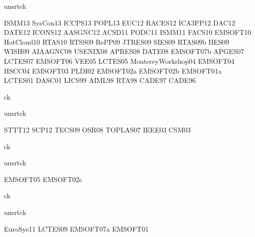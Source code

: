 {unsrtck}

\nocite{conferences}{ISMM13}
\nocite{conferences}{SysCon13}
\nocite{conferences}{ICCPS13}
\nocite{conferences}{POPL13}
\nocite{conferences}{EUC12}
\nocite{conferences}{RACES12}
\nocite{conferences}{ICA3PP12}
\nocite{conferences}{DAC12}
\nocite{conferences}{DATE12}
\nocite{conferences}{ICONS12}
\nocite{conferences}{AASGNC12}
\nocite{conferences}{ACSD11}
\nocite{conferences}{PODC11}
\nocite{conferences}{ISMM11}
\nocite{conferences}{FACS10}
\nocite{conferences}{EMSOFT10}
\nocite{conferences}{HotCloud10}
\nocite{conferences}{RTAS10}
\nocite{conferences}{RTSS09}
\nocite{conferences}{RePP09}
\nocite{conferences}{JTRES09}
\nocite{conferences}{SIES09}
\nocite{conferences}{RTAS09b}
\nocite{conferences}{IIES09}
\nocite{conferences}{WISH09}
\nocite{conferences}{AIAAGNC08}
\nocite{conferences}{USENIX08}
\nocite{conferences}{APRES08}
\nocite{conferences}{DATE08}
\nocite{conferences}{EMSOFT07b}
\nocite{conferences}{APGES07}
\nocite{conferences}{LCTES07}
\nocite{conferences}{EMSOFT06}
\nocite{conferences}{VEE05}
\nocite{conferences}{LCTES05}
\nocite{conferences}{MontereyWorkshop04}
\nocite{conferences}{EMSOFT04}
\nocite{conferences}{HSCC04}
\nocite{conferences}{EMSOFT03}
\nocite{conferences}{PLDI02}
\nocite{conferences}{EMSOFT02a}
\nocite{conferences}{EMSOFT02b}
\nocite{conferences}{EMSOFT01a}
\nocite{conferences}{LCTES01}
\nocite{conferences}{DASC01}
\nocite{conferences}{LICS99}
\nocite{conferences}{AIML98}
\nocite{conferences}{RTA98}
\nocite{conferences}{CADE97}
\nocite{conferences}{CADE96}

{ck}{}


{unsrtck}

\nocite{journals}{STTT12}
\nocite{journals}{SCP12}
\nocite{journals}{TECS09}
\nocite{journals}{OSR08}
\nocite{journals}{TOPLAS07}
\nocite{journals}{IEEE03}
\nocite{journals}{CSM03}

{ck}{}


{unsrtck}

\nocite{invited}{EMSOFT05}
\nocite{invited}{EMSOFT02c}

{ck}{}


{unsrtck}

\nocite{books}{EuroSys11}
\nocite{books}{LCTES09}
\nocite{books}{EMSOFT07a}
\nocite{books}{EMSOFT01}

